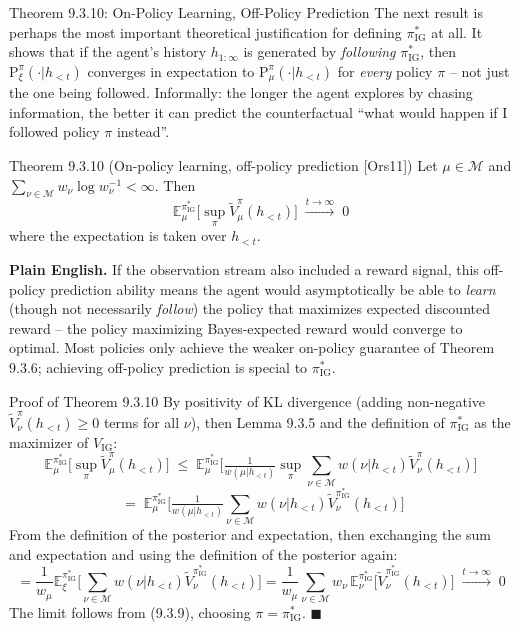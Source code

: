 \documentclass[aspectratio=169,10pt]{beamer}
\newcommand{\E}{\mathbb{E}}
\newcommand{\IG}{\mathrm{IG}}
\begin{document}
\begin{frame}{Theorem 9.3.10: On-Policy Learning, Off-Policy Prediction}
  The next result is perhaps the most important theoretical justification
  for defining $\pi^*_{\IG}$ at all. It shows that if the agent's history
  $h_{1:\infty}$ is generated by \emph{following} $\pi^*_{\IG}$, then
  $\mathrm{P}^\pi_\xi(\cdot|h_{<t})$ converges in expectation to
  $\mathrm{P}^\pi_\mu(\cdot|h_{<t})$ for \emph{every} policy $\pi$ -- not
  just the one being followed. Informally: the longer the agent explores
  by chasing information, the better it can predict the counterfactual
  ``what would happen if I followed policy $\pi$ instead''.

  \begin{block}{Theorem 9.3.10 (On-policy learning, off-policy prediction [Ors11])}
    Let $\mu\in\mathcal{M}$ and $\sum_{\nu\in\mathcal{M}} w_\nu\log w_\nu^{-1}<\infty$. Then
    \[
      \E^{\pi^*_{\IG}}_\mu\Big[\sup_\pi \tilde V^\pi_\mu(h_{<t})\Big] \;\xrightarrow{t\to\infty}\; 0
    \]
    where the expectation is taken over $h_{<t}$.
  \end{block}
  \textbf{Plain English.} If the observation stream also included a reward
  signal, this off-policy prediction ability means the agent would
  asymptotically be able to \emph{learn} (though not necessarily
  \emph{follow}) the policy that maximizes expected discounted reward --
  the policy maximizing Bayes-expected reward would converge to optimal.
  Most policies only achieve the weaker on-policy guarantee of Theorem
  9.3.6; achieving off-policy prediction is special to $\pi^*_{\IG}$.
\end{frame}

\begin{frame}{Proof of Theorem 9.3.10}
  By positivity of KL divergence (adding non-negative
  $\tilde V^\pi_\nu(h_{<t})\ge0$ terms for all $\nu$), then Lemma 9.3.5 and
  the definition of $\pi^*_{\IG}$ as the maximizer of $V_{\IG}$:
  {\small
  \[
    \E^{\pi^*_{\IG}}_\mu\Big[\sup_\pi\tilde V^\pi_\mu(h_{<t})\Big]
    \;\le\; \E^{\pi^*_{\IG}}_\mu\Big[\tfrac{1}{w(\mu|h_{<t})}\sup_\pi\textstyle\sum_{\nu\in\mathcal{M}} w(\nu|h_{<t})\tilde V^\pi_\nu(h_{<t})\Big]
  \]
  \[
    \;=\; \E^{\pi^*_{\IG}}_\mu\Big[\tfrac{1}{w(\mu|h_{<t})}\textstyle\sum_{\nu\in\mathcal{M}} w(\nu|h_{<t})\tilde V^{\pi^*_{\IG}}_\nu(h_{<t})\Big]
  \]}
  From the definition of the posterior and expectation, then exchanging
  the sum and expectation and using the definition of the posterior again:
  {\small
  \[
    = \frac{1}{w_\mu}\E^{\pi^*_{\IG}}_\xi\Big[\sum_{\nu\in\mathcal{M}} w(\nu|h_{<t})\tilde V^{\pi^*_{\IG}}_\nu(h_{<t})\Big]
    = \frac{1}{w_\mu}\sum_{\nu\in\mathcal{M}} w_\nu\, \E^{\pi^*_{\IG}}_\nu\big[\tilde V^{\pi^*_{\IG}}_\nu(h_{<t})\big] \;\xrightarrow{t\to\infty}\; 0
  \]}
  The limit follows from (9.3.9), choosing $\pi=\pi^*_{\IG}$. $\blacksquare$
\end{frame}
\end{document}
